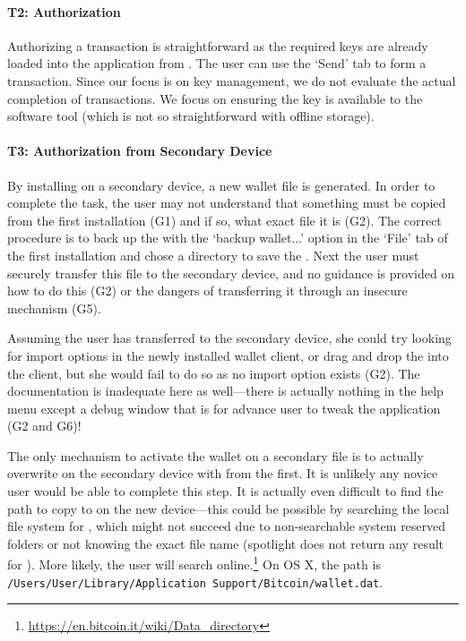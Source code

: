 \paragraph{T2: Authorization} 

Authorizing a transaction is straightforward as the required keys are already loaded into the application from \walletfile. The user can use the `Send' tab to form a transaction. Since our focus is on key management, we do not evaluate the actual completion of transactions. We focus on ensuring the key is available to the software tool (which is not so straightforward with \eg offline storage). 

\paragraph{T3: Authorization from Secondary Device} 

By installing \bitcoinclient on a secondary device, a new wallet file is generated. In order to complete the task, the user may not understand that something must be copied from the first installation (G1) and if so, what exact file it is (G2). The correct procedure is to back up the \walletfile with the `backup wallet...' option in the `File' tab of the first installation and chose a directory to save the \walletfile. Next the user must securely transfer this file to the secondary device, and no guidance is provided on how to do this (G2) or the dangers of transferring it through an insecure mechanism (G5).

Assuming the user has transferred \walletfile to the secondary device, she could try looking for import options in the newly installed wallet client, or drag and drop the \walletfile into the client, but she would fail to do so as no import option exists (G2). The documentation is inadequate here as well---there is actually nothing in the help menu except a debug window that is for advance user to tweak the application (G2 and G6)!

The only mechanism to activate the wallet on a secondary file is to actually overwrite \walletfile on the secondary device with \walletfile from the first. It is unlikely any novice user would be able to complete this step. It is actually even difficult to find the path to copy \walletfile to on the new device---this could be possible by searching the local file system for \walletfile, which might not succeed due to non-searchable system reserved folders or not knowing the exact file name (spotlight does not return any result for \walletfile). More likely, the user will search online.\footnote{\url{https://en.bitcoin.it/wiki/Data_directory}} On OS X, the path is \texttt{/Users/User/Library/Application Support/Bitcoin/wallet.dat}.

